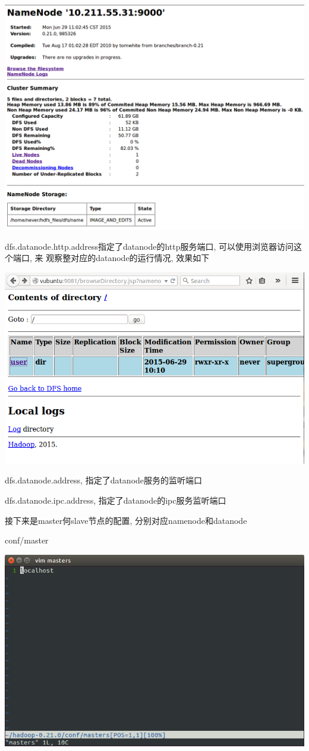 \includegraphics[width=\textwidth]{image/env/cr11.png}

dfs.datanode.http.address指定了datanode的http服务端口, 可以使用浏览器访问这个端口, 来
观察整对应的datanode的运行情况, 效果如下

\includegraphics[width=\textwidth]{image/env/cr12.png}

dfs.datanode.address, 指定了datanode服务的监听端口

dfs.datanode.ipc.address, 指定了datanode的ipc服务监听端口

接下来是master何slave节点的配置, 分别对应namenode和datanode

conf/master

\includegraphics[width=\textwidth]{image/env/cr13.png}

